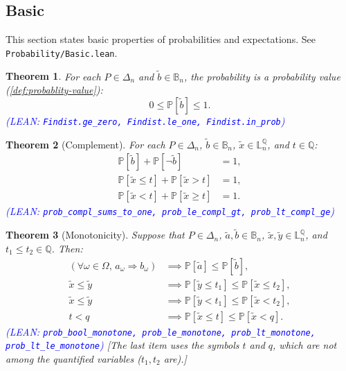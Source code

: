 \documentclass[letterpaper]{article}
\theoremstyle{plain}
\newtheorem{theorem}{Theorem}[subsection]
\theoremstyle{definition}
\theoremstyle{remark}
\newcommand{\PP}{\mathbb{P}}
\newcommand{\cc}[1]{\textcolor{ccolor}{[#1]}}
\newcommand{\lean}[1]{\textcolor{blue}{(\emph{LEAN}: \texttt{#1})}}
\newcommand{\leanok}{}
\begin{document}
\subsection{Basic}

This section states basic properties of probabilities and expectations. See \texttt{Probability/Basic.lean}.

\begin{theorem} \label{thm:prob-in-range}
  For each $P\in \Delta_n$ and $\tilde{b}\in \mathbb{B}_n$, the probability is a probability value (\cref{def:probablity-value}):
  \[
    0 \le \PP\left[ \tilde{b} \right] \le 1.
  \]
  \lean{Findist.ge\_zero, Findist.le\_one, Findist.in\_prob} \leanok
\end{theorem}

\begin{theorem}[Complement] \label{thm:prob-complement}
  For each $P\in \Delta_n$, $\tilde{b}\in \mathbb{B}_n$, $\tilde{x}\in \mathbb{L}_n^{\mathbb{Q}}$, and $t\in \mathbb{Q}$:
  \begin{align*}
    \PP\left[ \tilde{b} \right] + \PP\left[ \neg \tilde{b} \right] &= 1, \\
    \PP\left[ \tilde{x} \le t \right] + \PP\left[ \tilde{x} > t \right] &= 1, \\
    \PP\left[ \tilde{x} < t \right] + \PP\left[ \tilde{x} \ge t \right] &= 1.
  \end{align*}
  \lean{prob\_compl\_sums\_to\_one, prob\_le\_compl\_gt, prob\_lt\_compl\_ge} \leanok
\end{theorem}

\begin{theorem}[Monotonicity] \label{thm:prob-monotone}
  Suppose that $P\in \Delta_n$, $\tilde{a}, \tilde{b} \in \mathbb{B}_n$, $\tilde{x}, \tilde{y} \in \mathbb{L}_n^{\mathbb{Q}}$, and $t_1 \le t_2 \in \mathbb{Q}$. Then:
  \begin{align*}
    (\forall \omega\in \Omega,\, a_{\omega} \Rightarrow b_{\omega})
    &\implies \PP\left[ \tilde{a} \right] \le \PP\left[ \tilde{b} \right], \\
    \tilde{x} \le \tilde{y}
    &\implies \PP\left[ \tilde{y} \le t_1 \right] \le \PP\left[ \tilde{x} \le t_2 \right], \\
    \tilde{x} \le \tilde{y}
    &\implies \PP\left[ \tilde{y} < t_1 \right] \le \PP\left[ \tilde{x} < t_2 \right], \\
    t < q &\implies \PP\left[ \tilde{x} \le t \right] \le \PP\left[ \tilde{x} < q \right].
  \end{align*}
  \lean{prob\_bool\_monotone, prob\_le\_monotone, prob\_lt\_monotone, prob\_lt\_le\_monotone} \leanok
  \cc{The last item uses the symbols $t$ and $q$, which are not among the quantified variables ($t_1,t_2$ are).}
\end{theorem}
\end{document}
